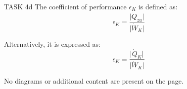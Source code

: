 TASK 4d  
The coefficient of performance \( \epsilon_K \) is defined as:  
\[
\epsilon_K = \frac{\lvert \dot{Q}_{zu} \rvert}{\lvert \dot{W}_K \rvert}
\]  

Alternatively, it is expressed as:  
\[
\epsilon_K = \frac{\lvert \dot{Q}_K \rvert}{\lvert \dot{W}_K \rvert}
\]  

No diagrams or additional content are present on the page.